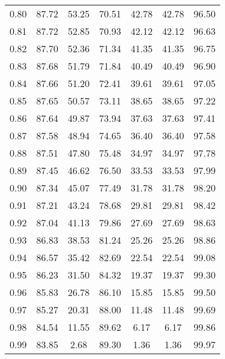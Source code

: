 \begin{tabular}{|c|c|c|c|c|c|c|}
      0.80 &     87.72 &     53.25 &      70.51 &   42.78 &      42.78 &         96.50 \\
      0.81 &     87.72 &     52.85 &      70.93 &   42.12 &      42.12 &         96.63 \\
      0.82 &     87.70 &     52.36 &      71.34 &   41.35 &      41.35 &         96.75 \\
      0.83 &     87.68 &     51.79 &      71.84 &   40.49 &      40.49 &         96.90 \\
      0.84 &     87.66 &     51.20 &      72.41 &   39.61 &      39.61 &         97.05 \\
      0.85 &     87.65 &     50.57 &      73.11 &   38.65 &      38.65 &         97.22 \\
      0.86 &     87.64 &     49.87 &      73.94 &   37.63 &      37.63 &         97.41 \\
      0.87 &     87.58 &     48.94 &      74.65 &   36.40 &      36.40 &         97.58 \\
      0.88 &     87.51 &     47.80 &      75.48 &   34.97 &      34.97 &         97.78 \\
      0.89 &     87.45 &     46.62 &      76.50 &   33.53 &      33.53 &         97.99 \\
      0.90 &     87.34 &     45.07 &      77.49 &   31.78 &      31.78 &         98.20 \\
      0.91 &     87.21 &     43.24 &      78.68 &   29.81 &      29.81 &         98.42 \\
      0.92 &     87.04 &     41.13 &      79.86 &   27.69 &      27.69 &         98.63 \\
      0.93 &     86.83 &     38.53 &      81.24 &   25.26 &      25.26 &         98.86 \\
      0.94 &     86.57 &     35.42 &      82.69 &   22.54 &      22.54 &         99.08 \\
      0.95 &     86.23 &     31.50 &      84.32 &   19.37 &      19.37 &         99.30 \\
      0.96 &     85.83 &     26.78 &      86.10 &   15.85 &      15.85 &         99.50 \\
      0.97 &     85.27 &     20.31 &      88.00 &   11.48 &      11.48 &         99.69 \\
      0.98 &     84.54 &     11.55 &      89.62 &    6.17 &       6.17 &         99.86 \\
      0.99 &     83.85 &      2.68 &      89.30 &    1.36 &       1.36 &         99.97 \\
\bottomrule
\end{tabular}
